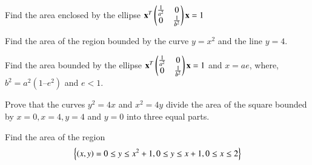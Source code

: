 \item Find the area enclosed by the ellipse
$
\mathbf{x}^T\begin{pmatrix}\frac{1}{a^2} & 0 \\ 0 & \frac{1}{b^2}\end{pmatrix}\mathbf{x} = 1
$
%
\item Find the area of the region bounded by the curve $y = x^2$
and the line $y = 4$.
%
\item Find the area bounded by the ellipse
$
\mathbf{x}^T\begin{pmatrix}\frac{1}{a^2} & 0 \\ 0 & \frac{1}{b^2}\end{pmatrix}\mathbf{x} = 1
$
and $x = ae$, where, $b^2 = a^2 (1 – e^2 )$ and $e < 1$.
%
\item Prove that the curves $y^2 = 4x$ and $x^2 = 4y$ divide the area of the square bounded by $x = 0, x = 4, y =4$ and $y = 0$ into three equal parts.
%
\item Find the area of the region
\begin{align}
\left\{\left(x,y\right) = 0\le y\le x^2+1, 0\le y \le x+1, 0 \le x \le 2\right\}
\end{align}

